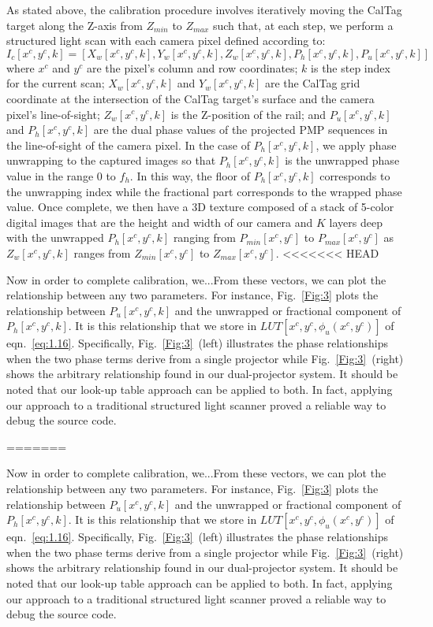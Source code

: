 \documentclass[]{spie}  %
\begin{document}
As stated above, the calibration procedure involves iteratively moving the CalTag target along the Z-axis from $Z_{min}$ to $Z_{max}$ such that, at each step, we perform a structured light scan with each camera pixel defined according to:
\begin{equation}
I_c[x^c, y^c, k] = [X_w[x^c, y^c, k], Y_w[x^c, y^c, k], Z_w[x^c, y^c, k], P_h[x^c, y^c, k], P_u[x^c, y^c, k]]
\label{calEqn}
\end{equation}
where $x^c$ and $y^c$ are the pixel's column and row coordinates; $k$ is the step index for the current scan; $X_w[x^c, y^c, k]$ and $Y_w[x^c, y^c, k]$ are the CalTag grid coordinate at the intersection of the CalTag target's surface and the camera pixel's line-of-sight; $Z_w[x^c, y^c, k]$ is the Z-position of the rail; and $P_u[x^c, y^c, k]$ and $P_h[x^c, y^c, k]$ are the dual phase values of the projected PMP sequences in the line-of-sight of the camera pixel.  In the case of $P_h[x^c, y^c, k]$, we apply phase unwrapping to the captured images so that $P_h[x^c, y^c, k]$ is the unwrapped phase value in the range 0 to $f_h$.  In this way, the floor of $P_h[x^c, y^c, k]$ corresponds to the unwrapping index while the fractional part corresponds to the wrapped phase value. Once complete, we then have a 3D texture composed of a stack of 5-color digital images that are the height and width of our camera and $K$ layers deep with the unwrapped $P_h[x^c, y^c, k]$ ranging from $P_{min}[x^c, y^c]$ to $P_{max}[x^c, y^c]$ as $Z_w[x^c, y^c, k]$ ranges from $Z_{min}[x^c, y^c]$ to $Z_{max}[x^c, y^c]$.
<<<<<<< HEAD

Now in order to complete calibration, we...From these vectors, we can plot the relationship between any two parameters.  For instance, Fig.~\ref{Fig:3} plots the relationship between $P_u[x^c, y^c, k]$ and the unwrapped or fractional component of $P_h[x^c, y^c, k]$.  It is this relationship that we store in $LUT[x^c, y^c, \phi_u(x^c, y^c)]$ of eqn.~\eqref{eq:1.16}.  Specifically, Fig.~\ref{Fig:3}~(left) illustrates the phase relationships when the two phase terms derive from a single projector while Fig.~\ref{Fig:3}~(right) shows the arbitrary relationship found in our dual-projector system.  It should be noted that our look-up table approach can be applied to both. In fact, applying our approach to a traditional structured light scanner proved a reliable way to debug the source code.

=======

Now in order to complete calibration, we...From these vectors, we can plot the relationship between any two parameters.  For instance, Fig.~\ref{Fig:3} plots the relationship between $P_u[x^c, y^c, k]$ and the unwrapped or fractional component of $P_h[x^c, y^c, k]$.  It is this relationship that we store in $LUT[x^c, y^c, \phi_u(x^c, y^c)]$ of eqn.~\eqref{eq:1.16}.  Specifically, Fig.~\ref{Fig:3}~(left) illustrates the phase relationships when the two phase terms derive from a single projector while Fig.~\ref{Fig:3}~(right) shows the arbitrary relationship found in our dual-projector system.  It should be noted that our look-up table approach can be applied to both. In fact, applying our approach to a traditional structured light scanner proved a reliable way to debug the source code.
\end{document}
